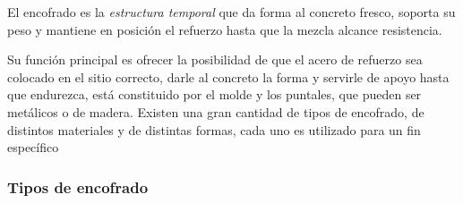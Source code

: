 \documentclass[12pt,a4paper]{article}
\begin{document}
	El encofrado es la \textit{estructura temporal} que da forma al concreto fresco, soporta su peso y mantiene en posición el refuerzo hasta que la mezcla alcance resistencia.
	
	Su función principal es ofrecer la posibilidad de que el acero de refuerzo
	sea colocado en el sitio correcto, darle al concreto la forma y servirle de apoyo
	hasta que endurezca, está constituido por el molde y los puntales, que pueden ser
	metálicos o de madera. Existen una gran cantidad de tipos de encofrado, de distintos materiales y de
	distintas formas, cada uno es utilizado para un fin específico
	
	\subsubsection{Tipos de encofrado}
	
\end{document}
